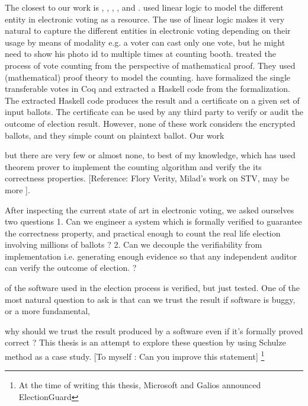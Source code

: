  The closest to our work is \cite{DeYoung:2012:LLV}, \cite{Pattinson:2015:VCM}, \cite{Pattinson:2016:MSP},
 \cite{Verity:2017:FVI:3014812.3014845}, and \cite{Ghale:2017:FVS}.  \cite{DeYoung:2012:LLV} 
 used linear logic\citep{GIRARD19871} to model the different entity in electronic voting as a resource. 
 The use of linear logic makes it very natural to capture the different entities in electronic voting  
 depending on their usage by means of modality e.g. a voter can cast only one vote, but he might 
 need to show his photo id to multiple times at counting booth. \cite{Pattinson:2015:VCM} treated 
 the process of vote counting from
 the perspective of mathematical proof. They used (mathematical) proof theory to model the 
 counting. \cite{Ghale:2017:FVS} have formalized the single transferable votes in Coq and 
 extracted a Haskell code from the formalization. The extracted Haskell code produces the result 
 and a certificate on a given set of input ballots. The certificate can be used by any third party to verify 
 or audit the outcome of election result.  However, none of these work considers the encrypted ballots, 
 and they simple count on plaintext ballot. Our work 
 
 
 
 
   
 but there are very few or almost none, to best of my knowledge, 
 which has used theorem prover to implement the counting algorithm 
 and verify the its correctness properties. 
 [Reference: Flory Verity, Milad's work on STV, may be more ].
 
   
 After inspecting the current state of art in electronic voting, we 
 asked ourselves two questions
 1. Can we engineer a system which is formally verified to 
    guarantee the correctness property, and practical enough
    to count the real life election involving millions of ballots ? 
 2. Can we decouple the verifiability from implementation i.e. 
    generating enough evidence so that any independent auditor can 
    verify the outcome of election. ? 
  
 
 of 
 the software used in the election process is verified, but just
 tested. One of the most natural question to ask is that 
 can we trust the result if software is buggy, or a more fundamental, 
 
 
 
 why should we trust the result produced by a software even 
 if it's formally proved correct ? This thesis is an attempt to 
 explore these question by using Schulze method as a case study.
 [To myself : Can you improve this statement]   
 \footnote{At the time of writing this thesis, Microsoft and Galios 
  announced ElectionGuard}
   
